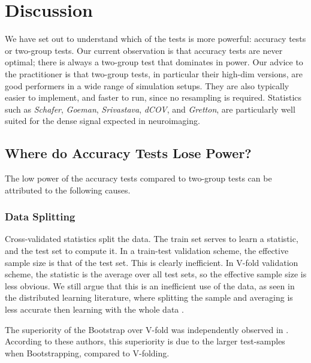 \documentclass[onecolumn,draftclsnofoot]{IEEEtran}
\begin{document}
\section{Discussion}
\label{sec:discussion}

We have set out to understand which of the tests is more powerful: accuracy tests or two-group tests. 
Our current observation is that accuracy tests are never optimal; there is always a two-group test that dominates in power. 
Our advice to the practitioner is that two-group tests, in particular their high-dim versions, are good performers in a wide range of simulation setups. 
They are also typically easier to implement, and faster to run, since no resampling is required. 
Statistics such as \emph{Schafer}\cite{schafer_shrinkage_2005}, \emph{Goeman}\cite{goeman2006testing}, \emph{Srivastava}\cite{srivastava_multivariate_2007}, \emph{dCOV}\cite{szekely2004testing}, and \emph{Gretton}\cite{gretton_kernel_2012-1}, are particularly well suited for the dense signal expected in neuroimaging.



\subsection{Where do Accuracy Tests Lose Power?}
The low power of the accuracy tests compared to two-group tests can be attributed to the following causes.

\subsubsection{Data Splitting}
Cross-validated statistics split the data.
The train set serves to learn a statistic, and the test set to compute it.
In a train-test validation scheme, the effective sample size is that of the test set.
This is clearly inefficient. 
In V-fold validation scheme, the statistic is the average over all test sets, so the effective sample size is less obvious. 
We still argue that this is an inefficient use of the data, as seen in the distributed learning literature, where splitting the sample and averaging is less accurate then learning with the whole data \cite{rosenblatt2016optimality}.

The superiority of the Bootstrap over V-fold was independently observed in \cite{yu2007two}. 
According to these authors, this superiority is due to the larger test-samples when Bootstrapping, compared to V-folding.
\end{document}
